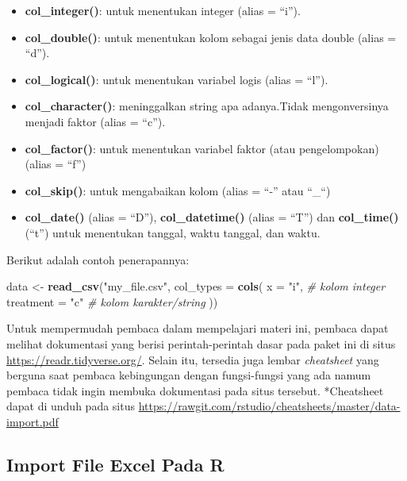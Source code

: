 \documentclass[]{book}
\newenvironment{Shaded}{\begin{snugshade}}{\end{snugshade}}
\newcommand{\KeywordTok}[1]{\textcolor[rgb]{0.13,0.29,0.53}{\textbf{#1}}}
\newcommand{\DataTypeTok}[1]{\textcolor[rgb]{0.13,0.29,0.53}{#1}}
\newcommand{\StringTok}[1]{\textcolor[rgb]{0.31,0.60,0.02}{#1}}
\newcommand{\CommentTok}[1]{\textcolor[rgb]{0.56,0.35,0.01}{\textit{#1}}}
\newcommand{\NormalTok}[1]{#1}
\providecommand{\tightlist}{%
  \setlength{\itemsep}{0pt}\setlength{\parskip}{0pt}}
\begin{document}
\begin{itemize}
\tightlist
\item
  \textbf{col\_integer()}: untuk menentukan integer (alias = ``i'').
\item
  \textbf{col\_double()}: untuk menentukan kolom sebagai jenis data
  double (alias = ``d'').
\item
  \textbf{col\_logical()}: untuk menentukan variabel logis (alias =
  ``l'').
\item
  \textbf{col\_character()}: meninggalkan string apa adanya.Tidak
  mengonversinya menjadi faktor (alias = ``c'').
\item
  \textbf{col\_factor()}: untuk menentukan variabel faktor (atau
  pengelompokan) (alias = ``f'')
\item
  \textbf{col\_skip()}: untuk mengabaikan kolom (alias = ``-'' atau
  ``\_``)
\item
  \textbf{col\_date()} (alias = ``D''), \textbf{col\_datetime()} (alias
  = ``T'') dan \textbf{col\_time()} (``t'') untuk menentukan tanggal,
  waktu tanggal, dan waktu.
\end{itemize}

Berikut adalah contoh penerapannya:

\begin{Shaded}
\begin{Highlighting}[]
\NormalTok{data <-}\StringTok{ }\KeywordTok{read_csv}\NormalTok{(}\StringTok{"my_file.csv"}\NormalTok{, }\DataTypeTok{col_types =} \KeywordTok{cols}\NormalTok{(}
  \DataTypeTok{x =} \StringTok{"i"}\NormalTok{, }\CommentTok{# kolom integer}
  \DataTypeTok{treatment =} \StringTok{"c"} \CommentTok{# kolom karakter/string}
\NormalTok{))}
\end{Highlighting}
\end{Shaded}

Untuk mempermudah pembaca dalam mempelajari materi ini, pembaca dapat
melihat dokumentasi yang berisi perintah-perintah dasar pada paket ini
di situs \url{https://readr.tidyverse.org/}. Selain itu, tersedia juga
lembar \emph{cheatsheet} yang berguna saat pembaca kebingungan dengan
fungsi-fungsi yang ada namum pembaca tidak ingin membuka dokumentasi
pada situs tersebut. *Cheatsheet dapat di unduh pada situs
\url{https://rawgit.com/rstudio/cheatsheets/master/data-import.pdf}

\subsection{Import File Excel Pada R}\label{import-file-excel-pada-r}
\end{document}

